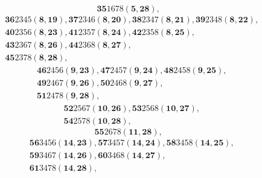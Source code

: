 \documentclass[aps, preprint]{revtex4}
\begin{document}
\begin{equation}\mathbf{35}1678 \left (\mathbf{5} ,\mathbf{28}\right )\text{,}
\end{equation}
\begin{align} & \mathbf{36}2345 \left (\mathbf{8} ,\mathbf{19}\right ) ,\mathbf{37}2346 \left (\mathbf{8} ,\mathbf{20}\right ) ,\mathbf{38}2347 \left (\mathbf{8} ,\mathbf{21}\right ) ,\mathbf{39}2348 \left (\mathbf{8} ,\mathbf{22}\right )\text{,} \\
 & \mathbf{40}2356 \left (\mathbf{8} ,\mathbf{23}\right ) ,\mathbf{41}2357 \left (\mathbf{8} ,\mathbf{24}\right ) ,\mathbf{42}2358 \left (\mathbf{8} ,\mathbf{25}\right )\text{,} \\
 & \mathbf{43}2367 \left (\mathbf{8} ,\mathbf{26}\right ) ,\mathbf{44}2368 \left (\mathbf{8} ,\mathbf{27}\right )\text{,} \\
 & \mathbf{45}2378 \left (\mathbf{8} ,\mathbf{28}\right )\text{,}\end{align}
\begin{align} & \mathbf{46}2456 \left (\mathbf{9} ,\mathbf{23}\right ) ,\mathbf{47}2457 \left (\mathbf{9} ,\mathbf{24}\right ) ,\mathbf{48}2458 \left (\mathbf{9} ,\mathbf{25}\right )\text{,} \\
 & \mathbf{49}2467 \left (\mathbf{9} ,\mathbf{26}\right ) ,\mathbf{50}2468 \left (\mathbf{9} ,\mathbf{27}\right )\text{,} \\
 & \mathbf{51}2478 \left (\mathbf{9} ,\mathbf{28}\right )\text{,}\end{align}
\begin{align} & \mathbf{52}2567 \left (\mathbf{10} ,\mathbf{26}\right ) ,\mathbf{53}2568 \left (\mathbf{10} ,\mathbf{27}\right )\text{,} \\
 & \mathbf{54}2578 \left (\mathbf{10} ,\mathbf{28}\right )\text{,}\end{align}
\begin{equation}\mathbf{55}2678 \left (\mathbf{11} ,\mathbf{28}\right )\text{,}
\end{equation}
\begin{align} & \mathbf{56}3456 \left (\mathbf{14} ,\mathbf{23}\right ) ,\mathbf{57}3457 \left (\mathbf{14} ,\mathbf{24}\right ) ,\mathbf{58}3458 \left (\mathbf{14} ,\mathbf{25}\right )\text{,} \\
 & \mathbf{59}3467 \left (\mathbf{14} ,\mathbf{26}\right ) ,\mathbf{60}3468 \left (\mathbf{14} ,\mathbf{27}\right )\text{,} \\
 & \mathbf{61}3478 \left (\mathbf{14} ,\mathbf{28}\right )\text{,}\end{align}
\end{document}
